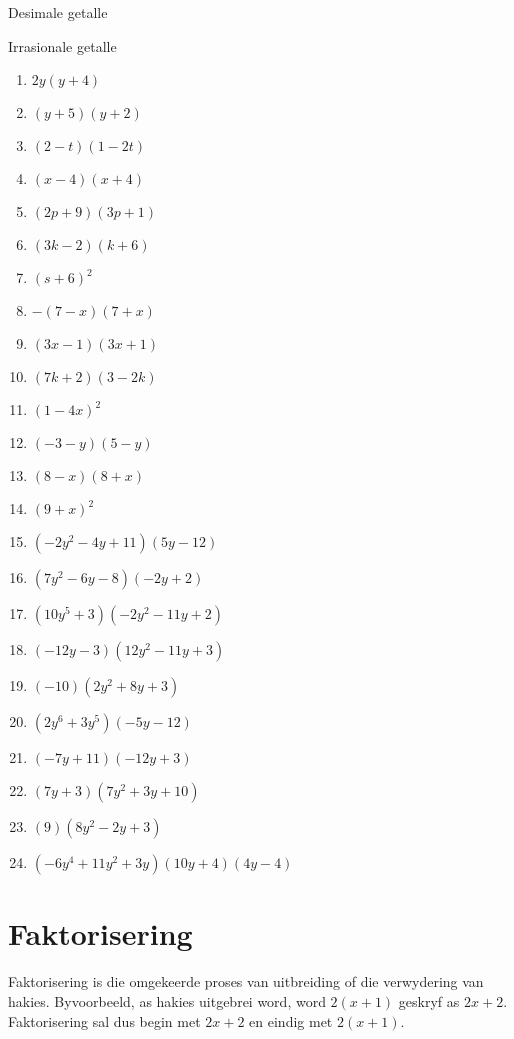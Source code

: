 \begin{Aktiwiteit}{Desimale getalle}
\begin{aktiwiteit}{Irrasionale getalle}
\begin{exercises}{}
{\begin{multicols}{2}
\begin{enumerate}[label=\textbf{\arabic*}., itemsep=5pt]
\item $2y(y+4)$ 
\item $(y+5)(y+2) $
\item $(2-t)(1-2t)$
\item $(x-4)(x+4)$
\item $ (2p+9)(3p+1)$
\item $(3k-2)(k+6)$
\item $(s+6)^2$
\item $-(7-x)(7+x)$
\item $(3x-1)(3x+1)$
\item $(7k+2)(3-2k)$
\item $(1-4x)^2$
\item $(-3-y)(5-y)$
\item $(8-x)(8+x)$
\item $(9+x)^2$
\item$(-2{y}^{2}-4y+11)(5y-12)$ 
\item$(7{y}^{2}-6y-8)(-2y+2)$%
\item$(10{y}^{5}+3)(-2{y}^{2}-11y+2)$ 
\item$(-12y-3)(12{y}^{2}-11y+3)$%
\item$(-10)(2{y}^{2}+8y+3)$ 
\item$(2{y}^{6}+3{y}^{5})(-5y-12)$%
\item$(-7y+11)(-12y+3)$%
\item$(7y+3)(7{y}^{2}+3y+10)$%
\item$(9)(8{y}^{2}-2y+3)$ 
\item$(-6{y}^{4}+11{y}^{2}+3y)(10y+4)(4y-4)$ 
\end{enumerate}
\end{multicols}

}
\end{exercises}





\section{Faktorisering}

Faktorisering is die omgekeerde proses van uitbreiding of die verwydering van hakies. Byvoorbeeld, as hakies uitgebrei word,
word $2(x+1)$ geskryf as $2x+2$. Faktorisering sal dus begin met $2x+2$ en eindig met $2(x+1)$. 


\end{aktiwiteit}
\end{Aktiwiteit}
